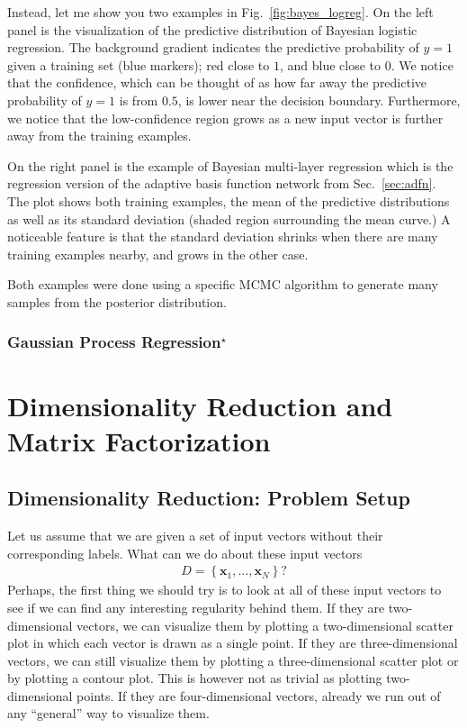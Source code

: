 \documentclass{report}
\newcommand{\vect}[1]{\mathbf{#1}}
\newcommand{\vx}[0]{\vect{x}}
\begin{document}
Instead, let me show you two examples in Fig.~\ref{fig:bayes_logreg}. On the
left panel is the visualization of the predictive distribution of Bayesian
logistic regression. The background gradient indicates the predictive
probability of $y=1$ given a training set (blue markers); red close to $1$, and
blue close to $0$. We notice that the confidence, which can be thought of as how
far away the predictive probability of $y=1$ is from $0.5$, is lower near the
decision boundary. Furthermore, we notice that the low-confidence region grows
as a new input vector is further away from the training examples.

On the right panel is the example of Bayesian multi-layer regression which is
the regression version of the adaptive basis function network from
Sec.~\ref{sec:adfn}. The plot shows both training examples, the mean of the
predictive distributions as well as its standard deviation (shaded region
surrounding the mean curve.) A noticeable feature is that the standard deviation
shrinks when there are many training examples nearby, and grows in the other
case. 

Both examples were done using a specific MCMC algorithm to generate many samples
from the posterior distribution.




\subsection{Gaussian Process Regression$^\star$}


\chapter{Dimensionality Reduction and Matrix Factorization}
\label{chap:dimred}


\section{Dimensionality Reduction: Problem Setup}
\label{sec:dimred}

Let us assume that we are given a set of input vectors without their
corresponding labels. What can we do about these input vectors 
\begin{align*}
    D=\left\{
    \vx_1, \ldots, \vx_N
\right\}?
\end{align*}
Perhaps, the first thing we should try is to look at all of these input vectors
to see if we can find any interesting regularity behind them. If they are
two-dimensional vectors, we can visualize them by plotting a two-dimensional
scatter plot in which each vector is drawn as a single point. If they are
three-dimensional vectors, we can still visualize them by plotting a
three-dimensional scatter plot or by plotting a contour plot. This is however
not as trivial as plotting two-dimensional points. If they are four-dimensional
vectors, already we run out of any ``general'' way to visualize them.
\end{document}
